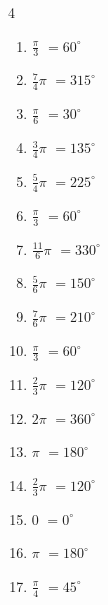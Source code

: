 \begin{multicols}{4}
\begin{enumerate}
  \item $\displaystyle \frac{\pi}{3}$
        $\displaystyle =60^{\circ}$

  \item $\displaystyle \frac{7}{4}\pi$
        $\displaystyle =315^{\circ}$

  \item $\displaystyle \frac{\pi}{6}$
        $\displaystyle =30^{\circ}$

  \item $\displaystyle \frac{3}{4}\pi$
        $\displaystyle =135^{\circ}$

\columnbreak %

  \item $\displaystyle \frac{5}{4}\pi$
        $\displaystyle =225^{\circ}$

  \item $\displaystyle \frac{\pi}{3}$
        $\displaystyle =60^{\circ}$

  \item $\displaystyle \frac{11}{6}\pi$
        $\displaystyle =330^{\circ}$

  \item $\displaystyle \frac{5}{6}\pi$
        $\displaystyle =150^{\circ}$

  \item $\displaystyle \frac{7}{6}\pi$
        $\displaystyle =210^{\circ}$

  \item $\displaystyle \frac{\pi}{3}$
        $\displaystyle =60^{\circ}$

  \item $\displaystyle \frac{2}{3}\pi$
        $\displaystyle =120^{\circ}$

  \item $\displaystyle 2\pi$
        $\displaystyle =360^{\circ}$

  \item $\displaystyle \pi$
        $\displaystyle =180^{\circ}$

  \item $\displaystyle \frac{2}{3}\pi$
        $\displaystyle =120^{\circ}$

  \item $\displaystyle 0$
        $\displaystyle =0^{\circ}$

  \item $\displaystyle \pi$
        $\displaystyle =180^{\circ}$

  \item $\displaystyle \frac{\pi}{4}$
        $\displaystyle =45^{\circ}$


\end{enumerate}
\end{multicols}
